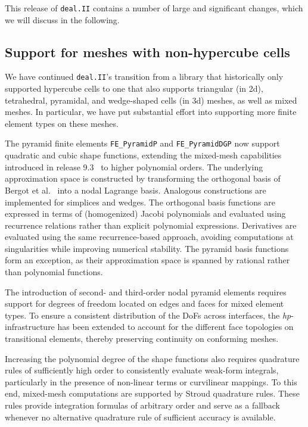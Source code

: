 \documentclass{ansarticle-preprint}
\newcommand{\specialword}[1]{\texttt{#1}}
\newcommand{\dealii}{{\specialword{deal.II}}\xspace}
\begin{document}
This release of \dealii contains a number of large and significant changes,
which we will discuss in the following.



\subsection{Support for meshes with non-hypercube cells}
\label{subsec:non-hypercube}

We have continued \dealii{}'s transition from a library that
historically only
supported hypercube cells to one that also supports triangular (in
2d), tetrahedral, pyramidal, and wedge-shaped cells (in 3d) meshes, as well
as mixed meshes. In particular, we have put substantial effort into
supporting more finite element types on these meshes.

The pyramid finite elements \texttt{FE\_PyramidP} and \texttt{FE\_PyramidDGP} now support quadratic and cubic shape functions, extending the mixed-mesh capabilities introduced in release 9.3~\cite{dealII93} to higher polynomial orders.
The underlying approximation space is constructed by transforming the
orthogonal basis of Bergot et al.~\cite{Bergot2010} into a nodal Lagrange basis.
Analogous constructions are implemented for simplices and wedges.
The orthogonal basis functions are expressed in terms of (homogenized) Jacobi polynomials and evaluated using recurrence relations rather than explicit polynomial expressions.
Derivatives are evaluated using the same recurrence-based approach, avoiding computations at singularities while improving numerical stability.
The pyramid basis functions form an exception, as their approximation space is spanned by rational rather than polynomial functions.

The introduction of second- and third-order nodal pyramid elements requires support for degrees of freedom located on edges and faces for mixed element types.
To ensure a consistent distribution of the DoFs across interfaces, the \textit{hp}-infrastructure has been extended to account for the different face topologies on transitional elements, thereby preserving continuity on conforming meshes.

Increasing the polynomial degree of the shape functions also requires quadrature rules of sufficiently high order to consistently evaluate weak-form integrals, particularly in the presence of non-linear terms or curvilinear mappings.
To this end, mixed-mesh computations are supported by Stroud quadrature rules.
These rules provide integration formulas of arbitrary order and serve as a fallback whenever no alternative quadrature rule of sufficient accuracy is available.
\end{document}
